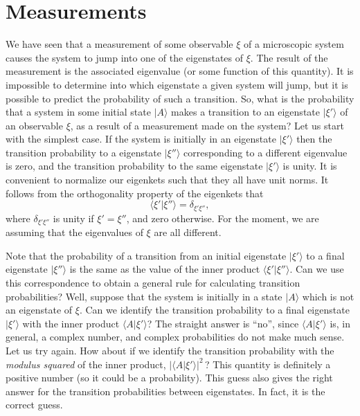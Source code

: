 \section{Measurements}\label{s2.10}
We have seen that a measurement of some observable $\xi$ of a microscopic
system causes the system to jump into one of the eigenstates of $\xi$. The
result of the measurement is the associated eigenvalue (or some function of
this quantity). It is impossible to determine into which eigenstate a 
given system will jump, but it is possible to predict the probability of
such a transition. So, what is the probability that a system in some
initial state $|A\rangle$ makes a transition to an eigenstate $|\xi'\rangle$
of an observable $\xi$, as a result of a measurement made on the system? 
Let us start with the simplest case. If the system is initially in an eigenstate
$|\xi'\rangle$ then the transition probability to a eigenstate $|\xi''\rangle$
corresponding to a different eigenvalue is zero, and the transition probability
to the same eigenstate $|\xi'\rangle$ is unity. It is convenient to normalize 
our eigenkets such that they all have unit norms. It follows from the
orthogonality property of the eigenkets that
\begin{equation}\label{e2.48}
\langle \xi'|\xi''\rangle = \delta_{\xi' \xi''},
\end{equation}
where $ \delta_{\xi' \xi''}$ is unity if $\xi'=\xi''$, and zero otherwise.
For the moment, we are assuming that  the eigenvalues of $\xi$ 
 are all different.

Note that the probability of a transition from an initial eigenstate
$|\xi'\rangle$ to a final eigenstate $|\xi''\rangle$ is the same as
the value of the  inner product
$\langle \xi'|\xi''\rangle$. Can we use  this correspondence 
to obtain  a general rule for
calculating transition probabilities? Well, suppose that the system is initially
in a state $|A\rangle$ which is not an eigenstate of $\xi$. Can we
identify the transition probability to a final eigenstate $|\xi'\rangle$ with
the inner product $\langle A| \xi'\rangle$? The straight answer is ``no'',
since  $\langle A| \xi'\rangle$ is, in general, a complex number, and complex
probabilities do not make much sense. Let us try again. How about if we
identify the transition probability with the {\em modulus squared} of the
inner product, $|\langle A| \xi'\rangle|^2$\,? This 
quantity is definitely a positive
number (so it could be a probability). This guess also gives the right answer for
the transition probabilities between eigenstates. In fact, it is the
correct guess.

